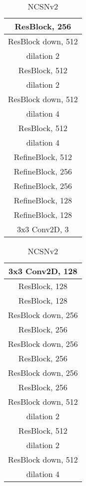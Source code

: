 \documentclass{article}
\begin{document}
\begin{table}[H]
\begin{subtable}[t]{0.3\linewidth}
\begin{tabular}{c}
        \midrule
        ResBlock, 256\\
        \midrule
        ResBlock down, 512\\ dilation 2\\
        \midrule
        ResBlock, 512\\ dilation 2\\
        \midrule
        ResBlock down, 512 \\ dilation 4\\
        \midrule
        ResBlock, 512 \\ dilation 4\\
        \midrule
        RefineBlock, 512\\
        \midrule
        RefineBlock, 256\\
        \midrule
        RefineBlock, 256\\
        \midrule
        RefineBlock, 128\\
        \midrule
        RefineBlock, 128\\
        \midrule
        3x3 Conv2D, 3\\
        \bottomrule
        \end{tabular}
    \end{subtable}
    \hfill
    \begin{subtable}[t]{0.3\linewidth}
        \centering
        \caption{NCSNv2 }
        \begin{tabular}{c}
        \toprule \toprule
        3x3 Conv2D, 128\\
        \midrule
        ResBlock, 128\\
        \midrule
        ResBlock, 128 \\
        \midrule
        ResBlock down, 256\\
        \midrule
        ResBlock, 256\\
        \midrule
        ResBlock down, 256\\
        \midrule
        ResBlock, 256\\
        \midrule
        ResBlock down, 256\\
        \midrule
        ResBlock, 256\\
        \midrule
        ResBlock down, 512\\ dilation 2\\
        \midrule
        ResBlock, 512\\ dilation 2\\
        \midrule
        ResBlock down, 512 \\ dilation 4\\

\end{tabular}
\end{subtable}
\end{table}
\end{document}

